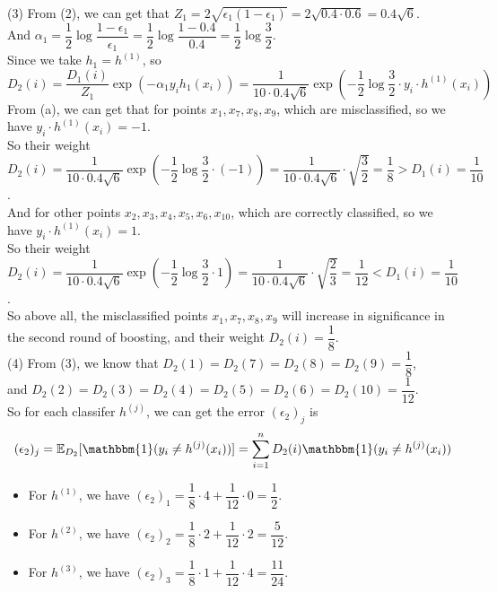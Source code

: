 \documentclass[10pt]{article}
\begin{document}
\begin{enumerate}[1.]
(3) From (2), we can get that $Z_1=2\sqrt{\epsilon_1(1-\epsilon_1)}=2\sqrt{0.4\cdot 0.6}=0.4\sqrt{6}$.\\
And $\alpha_1=\dfrac{1}{2}\log\dfrac{1-\epsilon_1}{\epsilon_1}=\dfrac{1}{2}\log\dfrac{1-0.4}{0.4}=\dfrac{1}{2}\log\dfrac{3}{2}$.\\
Since we take $h_1=h^{(1)}$, so
$$D_2(i)=\dfrac{D_1(i)}{Z_1}\exp\left(-\alpha_1y_ih_1(x_i)\right)=\dfrac{1}{10\cdot 0.4\sqrt{6}}\exp\left(-\dfrac{1}{2}\log\dfrac{3}{2}\cdot y_i\cdot h^{(1)}(x_i)\right)$$
From (a), we can get that for points $x_1,x_7,x_8,x_9$, which are misclassified, so we have $y_i\cdot h^{(1)}(x_i)=-1$.\\
So their weight $D_2(i)=\dfrac{1}{10\cdot 0.4\sqrt{6}}\exp\left(-\dfrac{1}{2}\log\dfrac{3}{2}\cdot (-1)\right)=\dfrac{1}{10\cdot 0.4\sqrt{6}}\cdot \sqrt{\dfrac{3}{2}}=\dfrac{1}{8}>D_1(i)=\dfrac{1}{10}$.\\
And for other points $x_2,x_3,x_4,x_5,x_6,x_{10}$, which are correctly classified, so we have $y_i\cdot h^{(1)}(x_i)=1$.\\
So their weight $D_2(i)=\dfrac{1}{10\cdot 0.4\sqrt{6}}\exp\left(-\dfrac{1}{2}\log\dfrac{3}{2}\cdot 1\right)=\dfrac{1}{10\cdot 0.4\sqrt{6}}\cdot \sqrt{\dfrac{2}{3}}=\dfrac{1}{12}<D_1(i)=\dfrac{1}{10}$.\\

So above all, the misclassified points $x_1,x_7,x_8,x_9$ will increase in significance in the second round of boosting, and their weight $D_2(i)=\dfrac{1}{8}$.\\

(4) From (3), we know that $D_2(1)=D_2(7)=D_2(8)=D_2(9)=\dfrac{1}{8}$,\\
and $D_2(2)=D_2(3)=D_2(4)=D_2(5)=D_2(6)=D_2(10)=\dfrac{1}{12}$.\\
So for each classifer $h^{(j)}$, we can get the error $(\epsilon_2)_j$ is
$$(\epsilon_2)_j=\mathbb{E}_{D_2}[\mathbbm{1}(y_{i} \neq h^{(j)}(x_{i}))]=\sum_{i=1}^{n} D_2(i)\mathbbm{1}(y_{i} \neq h^{(j)}(x_{i}))$$

\begin{itemize}
    \item For $h^{(1)}$, we have $(\epsilon_2)_1=\dfrac{1}{8}\cdot 4+\dfrac{1}{12}\cdot 0=\dfrac{1}{2}$.
    
    \item For $h^{(2)}$, we have $(\epsilon_2)_2=\dfrac{1}{8}\cdot 2+\dfrac{1}{12}\cdot 2=\dfrac{5}{12}$.

    \item For $h^{(3)}$, we have $(\epsilon_2)_3=\dfrac{1}{8}\cdot 1+\dfrac{1}{12}\cdot 4=\dfrac{11}{24}$.


\end{itemize}
\end{enumerate}
\end{document}
